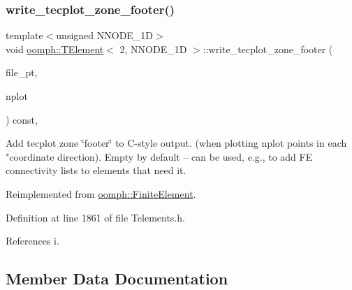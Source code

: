 \subsubsection{\texorpdfstring{write\+\_\+tecplot\+\_\+zone\+\_\+footer()}{write\_tecplot\_zone\_footer()}\hspace{0.1cm}{\footnotesize\ttfamily [2/2]}}
{\footnotesize\ttfamily template$<$unsigned N\+N\+O\+D\+E\+\_\+1D$>$ \\
void \hyperlink{classoomph_1_1TElement}{oomph\+::\+T\+Element}$<$ 2, N\+N\+O\+D\+E\+\_\+1D $>$\+::write\+\_\+tecplot\+\_\+zone\+\_\+footer (\begin{DoxyParamCaption}\item[{F\+I\+LE $\ast$}]{file\+\_\+pt,  }\item[{const unsigned \&}]{nplot }\end{DoxyParamCaption}) const\hspace{0.3cm}{\ttfamily [inline]}, {\ttfamily [virtual]}}



Add tecplot zone \char`\"{}footer\char`\"{} to C-\/style output. (when plotting nplot points in each "coordinate direction). Empty by default -- can be used, e.\+g., to add FE connectivity lists to elements that need it. 



Reimplemented from \hyperlink{classoomph_1_1FiniteElement_a03e50fc04226b7fb7641e053d6fd97bf}{oomph\+::\+Finite\+Element}.



Definition at line 1861 of file Telements.\+h.



References i.



\subsection{Member Data Documentation}
\mbox{\label{classoomph_1_1TElement_3_012_00_01NNODE__1D_01_4_aa2eb2c7f5a5c0242bcc5cb270ee07b2d}} 
